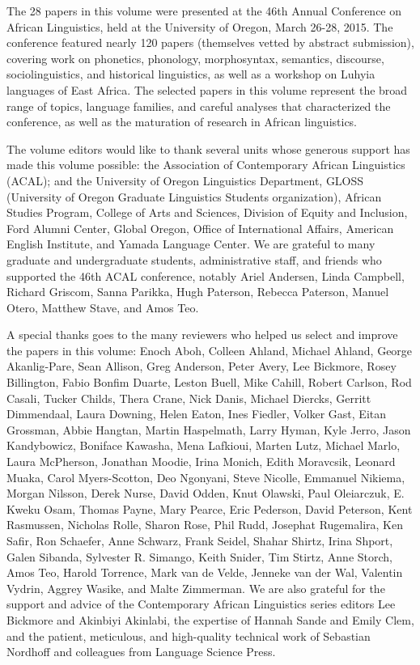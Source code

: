 
The 28 papers in this volume were presented at the 46th Annual Conference on African Linguistics, held at the University of Oregon, March 26-28, 2015. The conference featured nearly 120 papers (themselves vetted by abstract submission), covering work on phonetics, phonology, morphosyntax, semantics, discourse, sociolinguistics, and historical linguistics, as well as a workshop on Luhyia languages of East Africa. The selected papers in this volume represent the broad range of topics, language families, and careful analyses that characterized the conference, as well as the maturation of research in African linguistics. 

The volume editors would like to thank several units whose generous support has made this volume possible: the Association of Contemporary African Linguistics (ACAL); 
and the University of Oregon Linguistics Department, 
 GLOSS (University of Oregon Graduate Linguistics Students organization), 
 African Studies Program, 
 College of Arts and Sciences, 
 Division of Equity and Inclusion, 
 Ford Alumni Center, 
 Global Oregon, 
 Office of International Affairs,
 American English Institute, 
 and Yamada Language Center.
We are grateful to many graduate and undergraduate students, administrative staff, and friends who supported the 46th ACAL conference, notably 
  Ariel Andersen, 
  Linda Campbell, 
  Richard Griscom, 
  Sanna Parikka, 
  Hugh Paterson, 
  Rebecca Paterson, 
  Manuel Otero, 
  Matthew Stave, 
  and Amos Teo.

A special thanks goes to the many reviewers who helped us select and improve the papers in this volume: 
Enoch Aboh,
Colleen Ahland,
Michael Ahland,
George Akanlig-Pare,
Sean Allison,
Greg Anderson,
Peter Avery,
Lee Bickmore,
Rosey Billington,
Fabio Bonfim Duarte,
Leston Buell,
Mike Cahill,
Robert Carlson,
Rod Casali,
Tucker Childs,
Thera Crane,
Nick Danis,
Michael Diercks,
Gerritt Dimmendaal,
Laura Downing,
Helen Eaton,
Ines Fiedler,
Volker Gast,
Eitan Grossman,
Abbie Hangtan,
Martin Haspelmath,
Larry Hyman,
Kyle Jerro,
Jason Kandybowicz,
Boniface Kawasha,
Mena Lafkioui,
Marten Lutz,
Michael Marlo,
Laura McPherson,
Jonathan Moodie,
Irina Monich,
Edith Moravcsik,
Leonard Muaka,
Carol Myers-Scotton,
Deo Ngonyani,
Steve Nicolle,
Emmanuel Nikiema,
Morgan Nilsson,
Derek Nurse,
David Odden,
Knut Olawski,
Paul Oleiarczuk,
E. Kweku Osam,
Thomas Payne,
Mary Pearce,
Eric Pederson,
David Peterson,
Kent Rasmussen,
Nicholas Rolle,
Sharon Rose,
Phil Rudd,
Josephat Rugemalira,
Ken Safir,
Ron Schaefer,
Anne Schwarz,
Frank Seidel,
Shahar Shirtz,
Irina Shport,
Galen Sibanda,
Sylvester R. Simango,
Keith Snider,
Tim Stirtz,
Anne Storch,
Amos Teo,
Harold Torrence,
Mark van de Velde,
Jenneke van der Wal,
Valentin Vydrin,
Aggrey Wasike,
and Malte Zimmerman.
 We are also grateful for the support and advice of the Contemporary African Linguistics series editors Lee Bickmore and Akinbiyi Akinlabi, the expertise of Hannah Sande and Emily Clem, and the patient, meticulous, and high-quality technical work of Sebastian Nordhoff and colleagues from Language Science Press. 